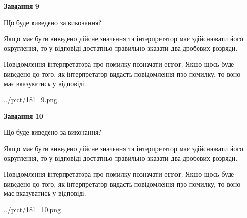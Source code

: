\documentclass[12pt, ukrainian]{article}
\begin{document}
{\begin {Large}
{\begin {center}\textbf{Завдання 9}\end {center}}\par
Що буде виведено за виконання? \par

Якщо має бути виведено дійсне значення та інтерпретатор має здійснювати його округлення, 
то у відповіді достатньо правильно вказати два дробових розряди.

Повідомлення інтерпретатора про помилку позначати \textbf{error}.
Якщо щось буде виведено до того, як інтерпретатор видасть повідомлення про помилку, 
то воно має вказуватись у відповіді. \par

\begin{center}
	{../pict/181_9.png}
\end{center}
\newpage

{\begin {center}\textbf{Завдання 10}\end {center}}\par
Що буде виведено за виконання? \par

Якщо має бути виведено дійсне значення та інтерпретатор має здійснювати його округлення, 
то у відповіді достатньо правильно вказати два дробових розряди.

Повідомлення інтерпретатора про помилку позначати \textbf{error}.
Якщо щось буде виведено до того, як інтерпретатор видасть повідомлення про помилку, 
то воно має вказуватись у відповіді. \par

\begin{center}
	{../pict/181_10.png}
\end{center}
\newpage

\end {Large}}
\end{document}
